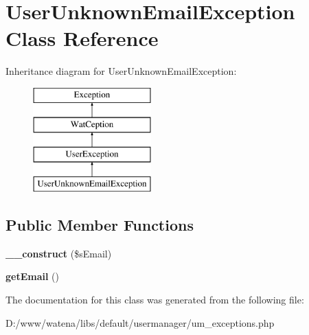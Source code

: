 \hypertarget{class_user_unknown_email_exception}{\section{User\-Unknown\-Email\-Exception Class Reference}
\label{class_user_unknown_email_exception}
}
Inheritance diagram for User\-Unknown\-Email\-Exception\-:\begin{figure}[H]
\begin{center}
\leavevmode
\includegraphics[height=4.000000cm]{class_user_unknown_email_exception}
\end{center}
\end{figure}
\subsection*{Public Member Functions}
\begin{DoxyCompactItemize}
\item 
\hypertarget{class_user_unknown_email_exception_acfe3e7be9b73f9be62f0da1575e7bc5d}{{\bfseries \-\_\-\-\_\-construct} (\$s\-Email)}\label{class_user_unknown_email_exception_acfe3e7be9b73f9be62f0da1575e7bc5d}

\item 
\hypertarget{class_user_unknown_email_exception_a84c8d68ea407ba1b1bc528c0445ce2d2}{{\bfseries get\-Email} ()}\label{class_user_unknown_email_exception_a84c8d68ea407ba1b1bc528c0445ce2d2}

\end{DoxyCompactItemize}


The documentation for this class was generated from the following file\-:\begin{DoxyCompactItemize}
\item 
D\-:/www/watena/libs/default/usermanager/um\-\_\-exceptions.\-php\end{DoxyCompactItemize}
